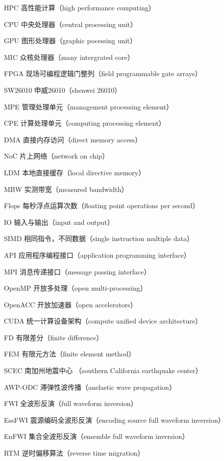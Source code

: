 \begin{denotation}
\item[HPC] 高性能计算（high performance computing）
\item[CPU] 中央处理器（central processing unit）
\item[GPU] 图形处理器（graphic pocessing unit）
\item[MIC] 众核处理器（many intergrated core）
\item[FPGA] 现场可编程逻辑门整列（field programmable gate arrays）
\item[SW26010] 申威26010（shenwei 26010）
\item[MPE] 管理处理单元（management processing element）
\item[CPE] 计算处理单元（computing processing element）
\item[DMA] 直接内存访问（direct memory access）
\item[NoC] 片上网络（network on chip）
\item[LDM] 本地直接缓存（local directive memory）
\item[MBW] 实测带宽（measured bandwidth）
\item[Flops] 每秒浮点运算次数（floating point operations per second）
\item[IO] 输入与输出（input and output）
\item[SIMD] 相同指令，不同数据（single instruction multiple data）
\item[API] 应用程序编程接口（application programming interface）
\item[MPI] 消息传递接口（message passing interface）
\item[OpenMP] 开放多处理（open multi-processing）
\item[OpenACC] 开放加速器（open accelerators）
\item[CUDA] 统一计算设备架构（compute unified device architecture）
\item[FD] 有限差分（finite difference）
\item[FEM] 有限元方法（finite element method）
\item[SCEC] 南加州地震中心 （southern California earthquake center）
\item[AWP-ODC] 滞弹性波传播（anelastic wave propagation）
\item[FWI] 全波形反演（full waveform inversion）
\item[EssFWI] 震源编码全波形反演（encoding source full waveform inversion）
\item[EnFWI] 集合全波形反演（ensemble full waveform inversion）
\item[RTM] 逆时偏移算法（reverse time migration）
\end{denotation}

